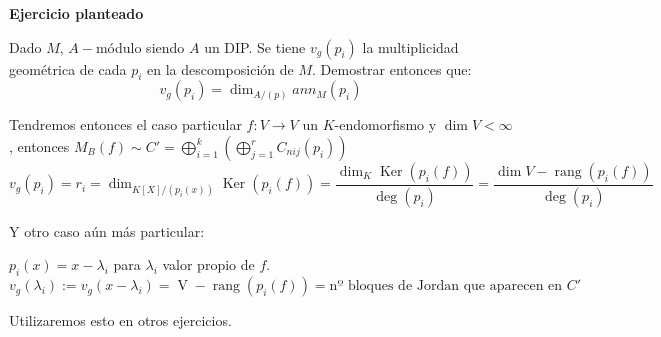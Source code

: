 \documentclass[openany]{book}
\begin{document}
\begin{exercise}
    \textbf{Ejercicio planteado}

    Dado $ M$, $ A-$módulo siendo $ A$ un DIP. Se tiene $ v_{g}(p_i)$ la multiplicidad geométrica de cada $ p_i$ en la descomposición de $ M$. Demostrar entonces que:
    $$ v_{g}(p_i) = \operatorname{dim}_{A/(p)} ann_{M}(p_i) $$
\end{exercise}

Tendremos entonces el caso particular $ f: V \to V$ un $ K$-endomorfismo y $ \operatorname{dim}V < \infty$, entonces $ M_{B}(f) \sim C' = \bigoplus_{i=1}^{k} \left( \bigoplus_{j=1}^{r} C_{nij}(p_i) \right)$
$$ v_{g}(p_i) = r_i = \operatorname{dim}_{K[X]/(p_i(x))} \operatorname{Ker}(p_i(f)) = \dfrac{\operatorname{dim}_{K} \operatorname{Ker}(p_i(f))}{\operatorname{deg}(p_i)} = \dfrac{\operatorname{dim}V - \operatorname{rang} (p_i(f))}{\operatorname{deg}(p_i)} $$

Y otro caso aún más particular:

$ p_i(x) = x - \lambda_i $ para $ \lambda_i $ valor propio de $ f$.
$$ v_{g}(\lambda_i ):= v_{g}(x-\lambda_i ) = \operatorname{V}-\operatorname{rang}(p_i(f)) = \text{nº bloques de Jordan que aparecen en }C' $$


Utilizaremos esto en otros ejercicios.
\end{document}
